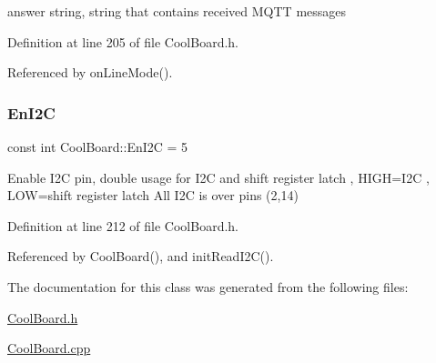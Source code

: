 answer string, string that contains received M\+Q\+TT messages 

Definition at line 205 of file Cool\+Board.\+h.



Referenced by on\+Line\+Mode().

\mbox{\label{class_cool_board_af1fe1376fc66f93dee80b327ca695377}} 
\subsubsection{\texorpdfstring{En\+I2C}{EnI2C}}
{\footnotesize\ttfamily const int Cool\+Board\+::\+En\+I2C = 5\hspace{0.3cm}{\ttfamily [private]}}

Enable I2C pin, double usage for I2C and shift register latch , H\+I\+GH=I2C , L\+OW=shift register latch All I2C is over pins (2,14) 

Definition at line 212 of file Cool\+Board.\+h.



Referenced by Cool\+Board(), and init\+Read\+I2\+C().



The documentation for this class was generated from the following files\+:\begin{DoxyCompactItemize}
\item 
\hyperlink{_cool_board_8h}{Cool\+Board.\+h}\item 
\hyperlink{_cool_board_8cpp}{Cool\+Board.\+cpp}\end{DoxyCompactItemize}
